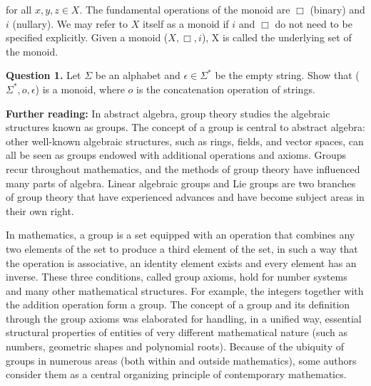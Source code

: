 \documentclass{article}
\begin{document}
for all $x, y, z \in X$. The fundamental operations of the monoid are $\Box$ (binary) and $i$ (nullary). We may refer to $X$ itself as a monoid if $i$ and $\Box$ do not need to be specified explicitly. Given a monoid ($X, \Box, i$), X is called the underlying set of the monoid.

\textbf{Question 1.} Let $\Sigma$ be an alphabet and $\epsilon \in \Sigma^*$ be the empty string. Show that ($\Sigma^*, o , \epsilon$) is a monoid, where $o$ is the concatenation operation of strings.

\begin{tcolorbox}
  \textbf{Further reading:} In abstract algebra, group theory studies the algebraic structures known as groups. The concept of a group is central to abstract algebra: other well-known algebraic structures, such as rings, fields, and vector spaces, can all be seen as groups endowed with additional operations and axioms. Groups recur throughout mathematics, and the methods of group theory have influenced many parts of algebra. Linear algebraic groups and Lie groups are two branches of group theory that have experienced advances and have become subject areas in their own right.
\end{tcolorbox}

\begin{tcolorbox}
  In mathematics, a group is a set equipped with an operation that combines any two elements of the set to produce a third element of the set, in such a way that the operation is associative, an identity element exists and every element has an inverse. These three conditions, called group axioms, hold for number systems and many other mathematical structures. For example, the integers together with the addition operation form a group. The concept of a group and its definition through the group axioms was elaborated for handling, in a unified way, essential structural properties of entities of very different mathematical nature (such as numbers, geometric shapes and polynomial roots). Because of the ubiquity of groups in numerous areas (both within and outside mathematics), some authors consider them as a central organizing principle of contemporary mathematics.
\end{tcolorbox}
\end{document}
